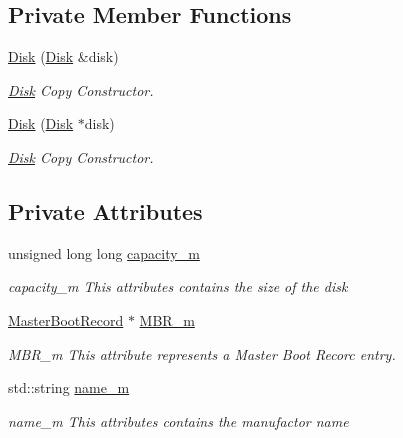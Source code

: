 \subsection*{Private Member Functions}
\begin{DoxyCompactItemize}
\item 
\mbox{\hyperlink{classdisk_1_1_disk_ad1fec93b14401a2496053fee61ec093e}{Disk}} (\mbox{\hyperlink{classdisk_1_1_disk}{Disk}} \&disk)
\begin{DoxyCompactList}\small\item\em \mbox{\hyperlink{classdisk_1_1_disk}{Disk}} Copy Constructor. \end{DoxyCompactList}\item 
\mbox{\hyperlink{classdisk_1_1_disk_a2c193c2ef0c575fe9ffa77eb2f7cf5ef}{Disk}} (\mbox{\hyperlink{classdisk_1_1_disk}{Disk}} $\ast$disk)
\begin{DoxyCompactList}\small\item\em \mbox{\hyperlink{classdisk_1_1_disk}{Disk}} Copy Constructor. \end{DoxyCompactList}\end{DoxyCompactItemize}
\subsection*{Private Attributes}
\begin{DoxyCompactItemize}
\item 
\mbox{\label{classdisk_1_1_disk_af6db0971ea86e029b84c79c74b067841}} 
unsigned long long \mbox{\hyperlink{classdisk_1_1_disk_af6db0971ea86e029b84c79c74b067841}{capacity\+\_\+m}}
\begin{DoxyCompactList}\small\item\em capacity\+\_\+m This attributes contains the size of the disk \end{DoxyCompactList}\item 
\mbox{\label{classdisk_1_1_disk_a7cfc1887c9bc52149c34a305291f4afb}} 
\mbox{\hyperlink{classdisk_1_1_master_boot_record}{Master\+Boot\+Record}} $\ast$ \mbox{\hyperlink{classdisk_1_1_disk_a7cfc1887c9bc52149c34a305291f4afb}{M\+B\+R\+\_\+m}}
\begin{DoxyCompactList}\small\item\em M\+B\+R\+\_\+m This attribute represents a Master Boot Recorc entry. \end{DoxyCompactList}\item 
\mbox{\label{classdisk_1_1_disk_a55d78f67d38e5148f16ae00282ef05dd}} 
std\+::string \mbox{\hyperlink{classdisk_1_1_disk_a55d78f67d38e5148f16ae00282ef05dd}{name\+\_\+m}}
\begin{DoxyCompactList}\small\item\em name\+\_\+m This attributes contains the manufactor name \end{DoxyCompactList}\end{DoxyCompactItemize}
